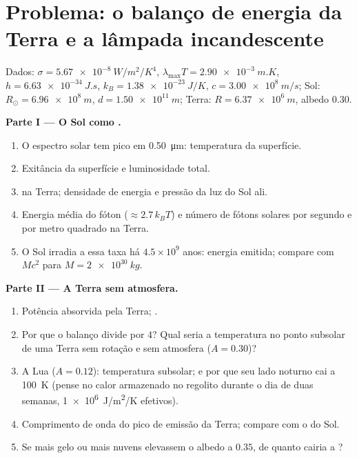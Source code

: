 \section{Problema: o balanço de energia da Terra e a lâmpada incandescente}

\begin{problem}\label{pb:b2:thermal-radiation:1}
Dados: $\sigma = \qty{5.67e-8}{W/m^2/K^4}$, $\lambda_{\max}T = \qty{2.90e-3}{m.K}$,
$h = \qty{6.63e-34}{J.s}$, $k_B = \qty{1.38e-23}{J/K}$, $c = \qty{3.00e8}{m/s}$;
Sol: $R_\odot = \qty{6.96e8}{m}$, $d = \qty{1.50e11}{m}$; Terra: $R =
\qty{6.37e6}{m}$, albedo $0.30$.

\textbf{Parte I --- O Sol como .}
\begin{enumerate}
  \item O espectro solar tem pico em \qty{0.50}{\micro m}: temperatura
        da superfície.
  \item Exitância da superfície e luminosidade total.
  \item {} na Terra; densidade de energia e pressão da
        luz do Sol ali.
  \item Energia média do fóton ($\approx 2.7\,k_BT$) e número de fótons
        solares por segundo e por metro quadrado na Terra.
  \item O Sol irradia a essa taxa há $4.5 \times 10^9$ anos:
        energia emitida; compare com $Mc^2$ para $M = \qty{2e30}{kg}$.
\end{enumerate}

\textbf{Parte II --- A Terra sem atmosfera.}
\begin{enumerate}[resume]
  \item Potência absorvida pela Terra; .
  \item Por que o balanço divide por $4$? Qual seria a
        temperatura no ponto subsolar de uma Terra sem rotação e sem
        atmosfera ($A = 0.30$)?
  \item A Lua ($A = 0.12$): temperatura subsolar; e por que seu lado
        noturno cai a \qty{100}{K} (pense no calor armazenado no
        regolito durante o dia de duas semanas, \qty{1e6}{J/m^2/K} efetivos).
  \item Comprimento de onda do pico de emissão da Terra; compare com o
        do Sol.
  \item Se mais gelo ou mais nuvens elevassem o albedo a $0.35$, de quanto
        cairia a ?
\end{enumerate}


\end{problem}
